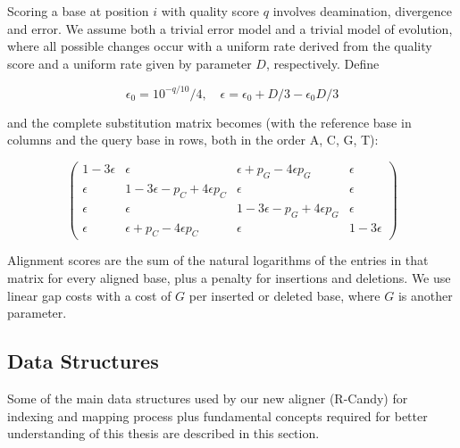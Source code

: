 \documentclass[11pt,a4paper]{report}
\begin{document}
Scoring a base at position $i$ with quality score $q$ involves
deamination, divergence and error.  We assume both a trivial error model
and a trivial model of evolution, where all possible changes occur with
a uniform rate derived from the quality score and a uniform rate given
by parameter $D$, respectively.  Define 

\begin{equation*}
\epsilon_0 = {10^{-q/10}}/4, \quad \epsilon = \epsilon_0 + D/3 - \epsilon_0 D/3
\end{equation*}

and the complete substitution matrix becomes (with the reference base in
columns and the
query base in rows, both in the order A, C, G, T):

\begin{equation*}
\left( \begin{array}{cccc}
1 - 3 \epsilon &       \epsilon                            &       \epsilon + p_{G} - 4 \epsilon p_{G} &       \epsilon \\
      \epsilon & 1 - 3 \epsilon - p_{C} + 4 \epsilon p_{C} &       \epsilon                            &       \epsilon \\
      \epsilon &       \epsilon                            & 1 - 3 \epsilon - p_{G} + 4 \epsilon p_{G} &       \epsilon \\
      \epsilon &       \epsilon + p_{C} - 4 \epsilon p_{C} &       \epsilon                            & 1 - 3 \epsilon 
\end{array} \right)
\end{equation*}

Alignment scores are the sum of the natural logarithms of the
entries in that matrix for every aligned base, plus a penalty for
insertions and deletions.  We use linear gap costs with a cost of $G$
per inserted or deleted base, where $G$ is another parameter.




\subsection{Data Structures}  \label{Data Structures}

Some of the main data structures used by our new aligner (R-Candy)
for indexing and mapping process plus fundamental concepts required
for better understanding of this thesis are described in this section. 
\end{document}

